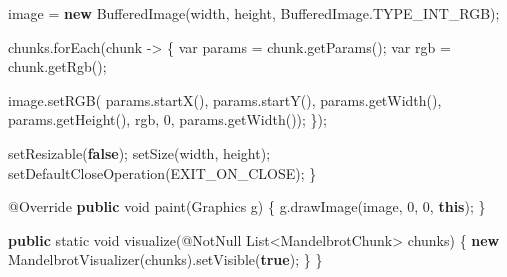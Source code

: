\documentclass[11pt]{article}
\newenvironment{Shaded}{}{}
\newcommand{\KeywordTok}[1]{\textcolor[rgb]{0.00,0.44,0.13}{\textbf{{#1}}}}
\newcommand{\DataTypeTok}[1]{\textcolor[rgb]{0.56,0.13,0.00}{{#1}}}
\newcommand{\DecValTok}[1]{\textcolor[rgb]{0.25,0.63,0.44}{{#1}}}
\newcommand{\FunctionTok}[1]{\textcolor[rgb]{0.02,0.16,0.49}{{#1}}}
\newcommand{\NormalTok}[1]{{#1}}
\newcommand{\OperatorTok}[1]{\textcolor[rgb]{0.40,0.40,0.40}{{#1}}}
\newcommand{\BuiltInTok}[1]{{#1}}
\newcommand{\AttributeTok}[1]{\textcolor[rgb]{0.49,0.56,0.16}{{#1}}}
\begin{document}
\begin{Shaded}
\begin{Highlighting}[]
\NormalTok{        image }\OperatorTok{=} \KeywordTok{new} \BuiltInTok{BufferedImage}\OperatorTok{(}\NormalTok{width}\OperatorTok{,}\NormalTok{ height}\OperatorTok{,} \BuiltInTok{BufferedImage}\OperatorTok{.}\FunctionTok{TYPE\_INT\_RGB}\OperatorTok{);}

\NormalTok{        chunks}\OperatorTok{.}\FunctionTok{forEach}\OperatorTok{(}\NormalTok{chunk }\OperatorTok{{-}\textgreater{}} \OperatorTok{\{}
            \DataTypeTok{var}\NormalTok{ params }\OperatorTok{=}\NormalTok{ chunk}\OperatorTok{.}\FunctionTok{getParams}\OperatorTok{();}
            \DataTypeTok{var}\NormalTok{ rgb }\OperatorTok{=}\NormalTok{ chunk}\OperatorTok{.}\FunctionTok{getRgb}\OperatorTok{();}

\NormalTok{            image}\OperatorTok{.}\FunctionTok{setRGB}\OperatorTok{(}
\NormalTok{                    params}\OperatorTok{.}\FunctionTok{startX}\OperatorTok{(),}\NormalTok{ params}\OperatorTok{.}\FunctionTok{startY}\OperatorTok{(),}
\NormalTok{                    params}\OperatorTok{.}\FunctionTok{getWidth}\OperatorTok{(),}\NormalTok{ params}\OperatorTok{.}\FunctionTok{getHeight}\OperatorTok{(),}
\NormalTok{                    rgb}\OperatorTok{,}
                    \DecValTok{0}\OperatorTok{,}\NormalTok{ params}\OperatorTok{.}\FunctionTok{getWidth}\OperatorTok{());}
        \OperatorTok{\});}

        \FunctionTok{setResizable}\OperatorTok{(}\KeywordTok{false}\OperatorTok{);}
        \FunctionTok{setSize}\OperatorTok{(}\NormalTok{width}\OperatorTok{,}\NormalTok{ height}\OperatorTok{);}
        \FunctionTok{setDefaultCloseOperation}\OperatorTok{(}\NormalTok{EXIT\_ON\_CLOSE}\OperatorTok{);}
    \OperatorTok{\}}

    \AttributeTok{@Override}
    \KeywordTok{public} \DataTypeTok{void} \FunctionTok{paint}\OperatorTok{(}\BuiltInTok{Graphics}\NormalTok{ g}\OperatorTok{)} \OperatorTok{\{}
\NormalTok{        g}\OperatorTok{.}\FunctionTok{drawImage}\OperatorTok{(}\NormalTok{image}\OperatorTok{,} \DecValTok{0}\OperatorTok{,} \DecValTok{0}\OperatorTok{,} \KeywordTok{this}\OperatorTok{);}
    \OperatorTok{\}}

    \KeywordTok{public} \DataTypeTok{static} \DataTypeTok{void} \FunctionTok{visualize}\OperatorTok{(}\AttributeTok{@NotNull} \BuiltInTok{List}\OperatorTok{\textless{}}\NormalTok{MandelbrotChunk}\OperatorTok{\textgreater{}}\NormalTok{ chunks}\OperatorTok{)} \OperatorTok{\{}
        \KeywordTok{new} \FunctionTok{MandelbrotVisualizer}\OperatorTok{(}\NormalTok{chunks}\OperatorTok{).}\FunctionTok{setVisible}\OperatorTok{(}\KeywordTok{true}\OperatorTok{);}
    \OperatorTok{\}}
\OperatorTok{\}}
\end{Highlighting}
\end{Shaded}
\end{document}
